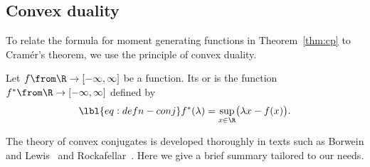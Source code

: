 \subsection*{Convex duality}

To relate the formula for moment generating functions in
Theorem~\ref{thm:cp} to Cram\'er's theorem, we use the principle of convex
duality.

\begin{defn}
Let $f \from \R \to [-\infty, \infty]$ be a function.  Its
 or  is the function $f^*
\from \R \to [-\infty, \infty]$ defined by
% 
\begin{equation}
\lbl{eq:defn-conj}
f^*(\lambda) = \sup_{x \in \R} \bigl( \lambda x - f(x) \bigr).
\end{equation}
\end{defn}

The theory of convex conjugates is developed thoroughly in texts such as
Borwein and Lewis~\cite{BoLe} and Rockafellar~\cite{Rock}.  Here we give a
brief summary tailored to our needs.

